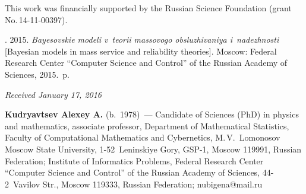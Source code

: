 


\Ack
\noindent
This work was financially supported by the Russian Science Foundation 
(grant No.\,14-11-00397).




  \begin{multicols}{2}

\renewcommand{\bibname}{\protect\rmfamily References}

{\small\frenchspacing
 {%
 \begin{thebibliography}{9}

. 
2015. \textit{Bayesovskie modeli v~teorii massovogo obsluzhivaniya i~nadezhnosti} 
[Bayesian models in mass service and reliability theories]. 
Moscow: Federal Research Center ``Computer Science and Control'' of the Russian
Academy of Sciences, 2015.~p.

\end{thebibliography}

 }
 }

\end{multicols}

\vspace*{-3pt}

\hfill{\small\textit{Received January 17, 2016}}

\Contrl

\noindent
\textbf{Kudryavtsev Alexey A.} (b.\ 1978)~---
Candidate of Sciences (PhD) in physics and mathematics, associate professor, 
Department of Mathematical Statistics, Faculty of Computational Mathematics 
and Cybernetics, M.\,V.~Lomonosov Moscow State University, 1-52~Leninskiye Gory, 
GSP-1, Moscow 119991, Russian Federation; Institute of Informatics Problems, 
Federal Research Center ``Computer Science and Control'' 
of the Russian Academy of Sciences, 44-2~Vavilov Str., Moscow 119333, 
Russian Federation; nubigena@mail.ru
\label{end\stat}


\renewcommand{\bibname}{\protect\rm Литература}